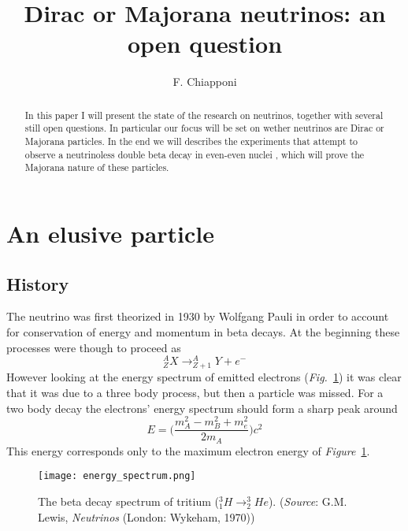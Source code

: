 \documentclass{subnucbo}
\begin{document}
\title{Dirac or Majorana neutrinos: an open question}

\author{F. Chiapponi} 



\maketitle

\begin{abstract}
In this paper I will present the state of the research on neutrinos, together with several still open questions. In particular our focus will be set on wether neutrinos are Dirac or Majorana particles. In the end we will describes the experiments that attempt to observe a neutrinoless double beta decay in even-even nuclei%
, which will prove the Majorana nature of these particles.
\end{abstract}

\section{An elusive particle}
\subsection{History}
The neutrino was first theorized in 1930 by Wolfgang Pauli in order to account for conservation of energy and momentum in beta decays.
At the beginning these processes were though to proceed as
\[
^A_Z X\rightarrow ^A_{Z+1}Y+e^-
\]
However looking at the energy spectrum of emitted electrons (\emph{Fig.}~\ref{fig:betaD}) it was clear that it was due to a three body process, but then a particle was missed. For a two body decay the electrons' energy spectrum should form a sharp peak around 
\begin{equation}
E=\biggl(\frac{m^2_A-m^2_B+m^2_e}{2m_A}\biggr)c^2
\label{eq:Emax}
\end{equation}
This energy corresponds only to the maximum electron energy of \emph{Figure}~\ref{fig:betaD}.

\begin{figure}[h]
\centering
\texttt{[image: energy\_spectrum.png]}
\caption{The beta decay spectrum of tritium ($^3_1H\rightarrow ^3_2He$). (\emph{Source}: G.M. Lewis, \emph{Neutrinos} (London: Wykeham, 1970))}
\label{fig:betaD}
\end{figure}
\end{document}
